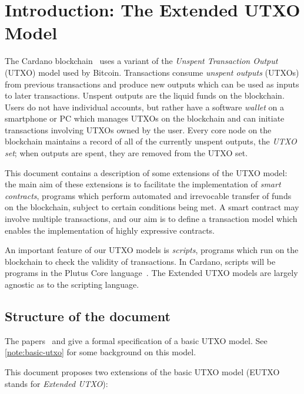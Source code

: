 \documentclass[a4paper]{article}
\newcounter{note}
\begin{document}
\maketitle

\section{Introduction: The Extended UTXO Model}
\label{sec:intro}
The Cardano blockchain~\citep{Cardano, Cardano-ledger-spec} uses a
variant of the \textit{Unspent Transaction Output} (UTXO) model used
by Bitcoin.  Transactions consume \textit{unspent outputs} (UTXOs)
from previous transactions and produce new outputs which can be used
as inputs to later transactions.  Unspent outputs are the liquid funds
on the blockchain. Users do not have individual accounts, but rather
have a software \textit{wallet} on a smartphone or PC which manages
UTXOs on the blockchain and can initiate transactions involving UTXOs
owned by the user.  Every core node on the blockchain maintains a
record of all of the currently unspent outputs, the \textit{UTXO set};
when outputs are spent, they are removed from the UTXO set.

This document contains a description of some extensions of the
UTXO model: the main aim of these extensions is to facilitate the
implementation of \textit{smart contracts}, programs which perform
automated and irrevocable transfer of funds on the blockchain, subject
to certain conditions being met.  A smart contract may involve
multiple transactions, and our aim is to define a transaction model
which enables the implementation of highly expressive contracts.

An important feature of our UTXO models is \textit{scripts},
programs which run on the blockchain to check the validity of
transactions.  In Cardano, scripts will be programs in the Plutus Core
language~\citep{Plutus-Core-spec}. The Extended UTXO models are largely
agnostic as to the scripting language.


\subsection{Structure of the document}
\label{sec:doc-structure}
The papers~\citep{Zahnentferner18-Chimeric} and
\citep{Zahnentferner18-UTxO} give a formal specification of a basic
UTXO model. See \cref{note:basic-utxo} for some background on
this model.

\medskip
\noindent This document proposes two extensions of the basic UTXO
model (EUTXO stands for \textit{Extended UTXO}):
\end{document}
